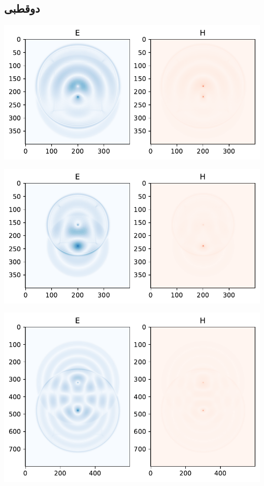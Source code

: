 \documentclass[12pt,a4paper]{article}
\begin{document}
	\subsection{دوقطبی}
	\begin{center}
		\includegraphics{dipole}
	\end{center}
	\begin{center}
		\includegraphics{dipole2}
	\end{center}
	\begin{center}
		\includegraphics{dipole3}
	\end{center}
\end{document}
